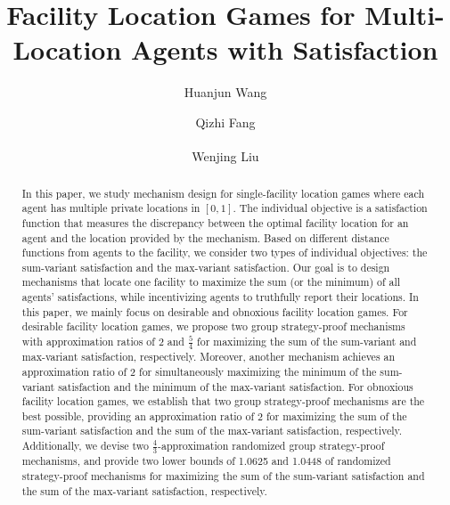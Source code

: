 \documentclass[runningheads]{11llncst}
\begin{document}
\title{Facility Location Games for Multi-Location Agents with Satisfaction}


\author{Huanjun Wang \and
Qizhi Fang \and
Wenjing Liu\textsuperscript{\Letter}}
%
%



\maketitle              %


\begin{abstract}
     In this paper, we study mechanism design for single-facility location games where each agent has multiple private locations in $[0,1]$. The individual objective is a satisfaction function that measures the discrepancy between the optimal facility location for an agent and the location provided by the mechanism. Based on  different distance functions from  agents to the facility, we consider two types of individual objectives: the sum-variant satisfaction and the max-variant satisfaction. Our goal is to design mechanisms that locate one facility to maximize  the sum (or the minimum) of all agents’ satisfactions, while  incentivizing agents to truthfully report their locations.    In this paper, we mainly focus on desirable and obnoxious facility location games.   For desirable facility location games, we propose two group strategy-proof mechanisms with approximation ratios of $2$ and $\frac{5}{4}$ for maximizing the sum of the sum-variant and  max-variant satisfaction, respectively. Moreover, another mechanism achieves an approximation ratio of 2 for simultaneously maximizing the minimum of the sum-variant satisfaction  and the minimum of the  max-variant satisfaction.   For  obnoxious facility location games, we establish that two group strategy-proof mechanisms are the best possible,  providing an approximation ratio of $2$ for maximizing the sum of the sum-variant satisfaction and the sum of the  max-variant satisfaction, respectively. Additionally, we devise two $\frac{4}{3}$-approximation randomized group strategy-proof mechanisms, and provide two lower bounds of 1.0625 and 1.0448 of randomized strategy-proof mechanisms for maximizing the sum of the sum-variant satisfaction and the sum of the max-variant satisfaction, respectively.
    
\end{abstract}
\end{document}
